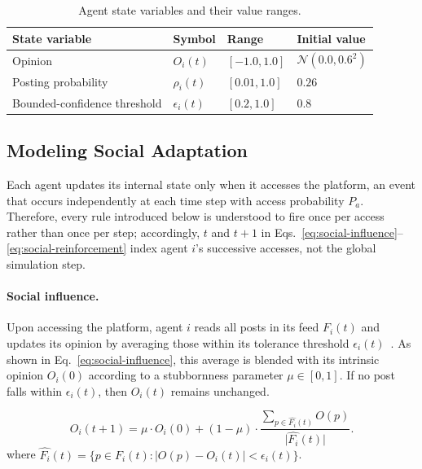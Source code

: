 \documentclass{svproc}
\def\Black{\color[rgb]{0,0,0}}
\def\post{\rho}                 %
\def\BoundedConfidence{\epsilon} %
\def\feed{F}                    %
\def\Stubbornness{\mu}           %
\begin{document}
\begin{table}[t]
\centering
\caption{Agent state variables and their value
  ranges.}\label{tab:state}
\tabcolsep=5pt
\begin{tabular}{llll}
\toprule
State variable & Symbol & Range & Initial value \\
\midrule
Opinion & $O_i(t)$ & $[ -1.0, 1.0]$ & $\mathcal{N}(0.0, 0.6^2)$ \\
Posting probability & $\post_i(t)$ & $[0.01, 1.0]$ & $0.26$ \\
Bounded-confidence threshold & $\BoundedConfidence_i(t)$ & $[0.2, 1.0]$ & $0.8$ \\
\bottomrule
\end{tabular}\Black
\end{table}



\subsection{Modeling Social Adaptation}\label{sec:model-adaptation}
Each agent updates its internal state only when it accesses the
platform, an event that occurs independently at each time step with
access probability $P_a$. Therefore, every rule introduced below is
understood to fire once per access rather than once per step;
accordingly, $t$ and $t{+}1$ in
Eqs.~\eqref{eq:social-influence}--\eqref{eq:social-reinforcement} index
agent $i$'s successive accesses, not the global simulation step.
\par


\paragraph{Social influence.}
Upon accessing the platform, agent $i$ reads all posts in its feed
$\feed_i(t)$ and updates its opinion by averaging those within its
tolerance threshold $\BoundedConfidence_i(t)$~\cite{friedkin1990}. As
shown in Eq.~\eqref{eq:social-influence}, this average is blended with
its intrinsic opinion $O_i(0)$ according to a stubbornness parameter
$\Stubbornness\in[0,1]$. If no post falls within
$\BoundedConfidence_i(t)$, then $O_i(t)$ remains unchanged.
%

\begin{equation}
  O_i(t{+}1) = \Stubbornness\cdot O_i(0)
  + (1-\Stubbornness)\cdot
  \frac{\sum_{p\in \hat{\feed_i}(t)} O(p)}%
       {\big|\widehat{\feed_i}(t)\big|}.
  \label{eq:social-influence}
\end{equation}
where $\widehat{\feed_i}(t)=\{p\in \feed_i(t) : |O(p)-O_i(t)|<\BoundedConfidence_i(t)\}$.
%
\end{document}
